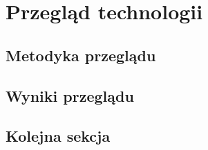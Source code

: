 \chapter{Przegląd technologii}
\lipsum[2]

\section{Metodyka przeglądu}
\lipsum[3]

\section{Wyniki przeglądu}
\lipsum[4]

\section{Kolejna sekcja}
\lipsum[3]